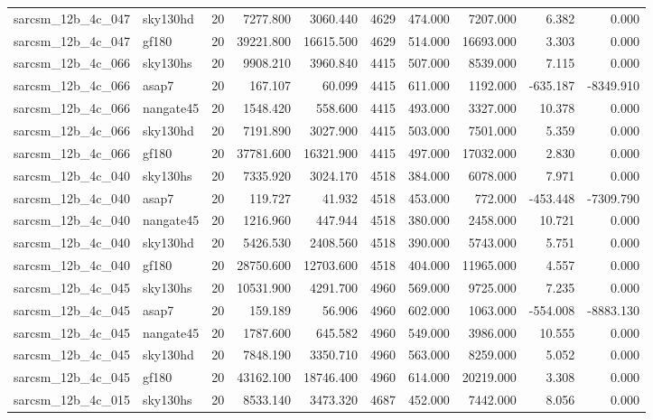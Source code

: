\begin{tabular}{llrrrrrrrr}
sarcsm\_12b\_4c\_047 & sky130hd & 20 & 7277.800 & 3060.440 & 4629 & 474.000 & 7207.000 & 6.382 & 0.000 \\
sarcsm\_12b\_4c\_047 & gf180 & 20 & 39221.800 & 16615.500 & 4629 & 514.000 & 16693.000 & 3.303 & 0.000 \\
sarcsm\_12b\_4c\_066 & sky130hs & 20 & 9908.210 & 3960.840 & 4415 & 507.000 & 8539.000 & 7.115 & 0.000 \\
sarcsm\_12b\_4c\_066 & asap7 & 20 & 167.107 & 60.099 & 4415 & 611.000 & 1192.000 & -635.187 & -8349.910 \\
sarcsm\_12b\_4c\_066 & nangate45 & 20 & 1548.420 & 558.600 & 4415 & 493.000 & 3327.000 & 10.378 & 0.000 \\
sarcsm\_12b\_4c\_066 & sky130hd & 20 & 7191.890 & 3027.900 & 4415 & 503.000 & 7501.000 & 5.359 & 0.000 \\
sarcsm\_12b\_4c\_066 & gf180 & 20 & 37781.600 & 16321.900 & 4415 & 497.000 & 17032.000 & 2.830 & 0.000 \\
sarcsm\_12b\_4c\_040 & sky130hs & 20 & 7335.920 & 3024.170 & 4518 & 384.000 & 6078.000 & 7.971 & 0.000 \\
sarcsm\_12b\_4c\_040 & asap7 & 20 & 119.727 & 41.932 & 4518 & 453.000 & 772.000 & -453.448 & -7309.790 \\
sarcsm\_12b\_4c\_040 & nangate45 & 20 & 1216.960 & 447.944 & 4518 & 380.000 & 2458.000 & 10.721 & 0.000 \\
sarcsm\_12b\_4c\_040 & sky130hd & 20 & 5426.530 & 2408.560 & 4518 & 390.000 & 5743.000 & 5.751 & 0.000 \\
sarcsm\_12b\_4c\_040 & gf180 & 20 & 28750.600 & 12703.600 & 4518 & 404.000 & 11965.000 & 4.557 & 0.000 \\
sarcsm\_12b\_4c\_045 & sky130hs & 20 & 10531.900 & 4291.700 & 4960 & 569.000 & 9725.000 & 7.235 & 0.000 \\
sarcsm\_12b\_4c\_045 & asap7 & 20 & 159.189 & 56.906 & 4960 & 602.000 & 1063.000 & -554.008 & -8883.130 \\
sarcsm\_12b\_4c\_045 & nangate45 & 20 & 1787.600 & 645.582 & 4960 & 549.000 & 3986.000 & 10.555 & 0.000 \\
sarcsm\_12b\_4c\_045 & sky130hd & 20 & 7848.190 & 3350.710 & 4960 & 563.000 & 8259.000 & 5.052 & 0.000 \\
sarcsm\_12b\_4c\_045 & gf180 & 20 & 43162.100 & 18746.400 & 4960 & 614.000 & 20219.000 & 3.308 & 0.000 \\
sarcsm\_12b\_4c\_015 & sky130hs & 20 & 8533.140 & 3473.320 & 4687 & 452.000 & 7442.000 & 8.056 & 0.000 \\

\end{tabular}
